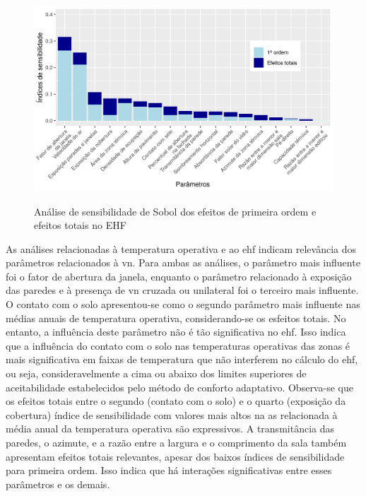 \documentclass[brazil,hardcopy,openany]{ufscthesis} %
\newcommand{\sasize}{1}
\begin{document}
\begin{figure}[H]
	\centering
	\caption{Análise de sensibilidade de Sobol dos efeitos de primeira ordem e efeitos totais no EHF}
	\includegraphics[width=\sasize\linewidth]{img/as_ehf.png}
	\label{fig:as_ehf}
\end{figure}

As análises relacionadas à temperatura operativa e ao \acrshort{ehf} indicam relevância dos parâmetros relacionados à \acrshort{vn}. Para ambas as análises, o parâmetro mais influente foi o fator de abertura da janela, enquanto o parâmetro relacionado à exposição das paredes e à presença de \acrshort{vn} cruzada ou unilateral foi o terceiro mais influente. 
O contato com o solo apresentou-se como o segundo parâmetro mais influente nas médias anuais de temperatura operativa, considerando-se os esfeitos totais. No entanto, a influência deste parâmetro não é tão significativa no \acrshort{ehf}. Isso indica que a influência do contato com o solo nas temperaturas operativas das zonas é mais significativa em faixas de temperatura que não interferem no cálculo do \acrshort{ehf}, ou seja, consideravelmente a cima ou abaixo dos limites superiores de aceitabilidade estabelecidos pelo método de conforto adaptativo.
Observa-se que os efeitos totais entre o segundo (contato com o solo) e o quarto (exposição da cobertura) índice de sensibilidade com valores mais altos na \acrshort{as} relacionada à média anual da temperatura operativa são expressivos.
A transmitância das paredes, o azimute, e a razão entre a largura e o comprimento da sala também apresentam efeitos totais relevantes, apesar dos baixos índices de sensibilidade para primeira ordem. Isso indica que há interações significativas entre esses parâmetros e os demais.
\end{document}
